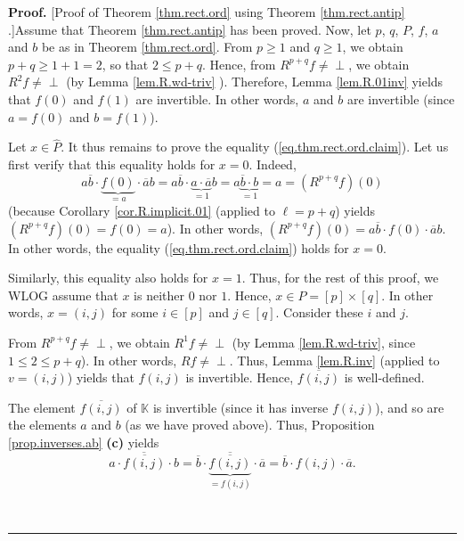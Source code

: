 \documentclass[numbers=enddot,12pt,final,onecolumn,notitlepage]{scrartcl}%
\theoremstyle{definition}
\newenvironment{verlong}{}{}
\newcommand{\undf}{\operatorname*{\bot}}
\newenvironment{proof}[1][Proof]{\noindent\textbf{#1.} }{\ \rule{0.5em}{0.5em}}
\begin{document}
\begin{verlong}
\begin{proof}
[Proof of Theorem \ref{thm.rect.ord} using Theorem \ref{thm.rect.antip}%
.]Assume that Theorem \ref{thm.rect.antip} has been proved. Now, let $p$, $q$,
$P$, $f$, $a$ and $b$ be as in Theorem \ref{thm.rect.ord}. From $p\geq1$ and
$q\geq1$, we obtain $p+q\geq1+1=2$, so that $2\leq p+q$. Hence, from
$R^{p+q}f\neq\undf$, we obtain $R^{2}f\neq\undf$ (by Lemma \ref{lem.R.wd-triv}%
). Therefore, Lemma \ref{lem.R.01inv} yields that $f\left(  0\right)  $ and
$f\left(  1\right)  $ are invertible. In other words, $a$ and $b$ are
invertible (since $a=f\left(  0\right)  $ and $b=f\left(  1\right)  $).

Let $x \in\widehat{P}$. It thus remains to prove the equality
(\ref{eq.thm.rect.ord.claim}). Let us first verify that this equality holds
for $x=0$. Indeed,%
\[
a\overline{b}\cdot\underbrace{f\left(  0\right)  }_{=a}\cdot\overline
{a}b=a\overline{b}\cdot\underbrace{a\cdot\overline{a}}_{=1}%
b=a\underbrace{\overline{b}\cdot b}_{=1}=a=\left(  R^{p+q}f\right)  \left(
0\right)
\]
(because Corollary \ref{cor.R.implicit.01} (applied to $\ell=p+q$) yields
$\left(  R^{p+q}f\right)  \left(  0\right)  =f\left(  0\right)  =a$). In other
words, $\left(  R^{p+q}f\right)  \left(  0\right)  =a\overline{b}\cdot
f\left(  0\right)  \cdot\overline{a}b$. In other words, the equality
(\ref{eq.thm.rect.ord.claim}) holds for $x=0$.

Similarly, this equality also holds for $x=1$. Thus, for the rest of this
proof, we WLOG assume that $x$ is neither $0$ nor $1$. Hence, $x\in P=\left[
p\right]  \times\left[  q\right]  $. In other words, $x=\left(  i,j\right)  $
for some $i\in\left[  p\right]  $ and $j\in\left[  q\right]  $. Consider these
$i$ and $j$.

From $R^{p+q}f\neq\undf$, we obtain $R^{1}f\neq\undf$ (by Lemma
\ref{lem.R.wd-triv}, since $1\leq2\leq p+q$). In other words, $Rf\neq\undf$.
Thus, Lemma \ref{lem.R.inv} (applied to $v=\left(  i,j\right)  $) yields that
$f\left(  i,j\right)  $ is invertible. Hence, $\overline{f\left(  i,j\right)
}$ is well-defined.

The element $\overline{f\left(  i,j\right)  }$ of $\mathbb{K}$ is invertible
(since it has inverse $f\left(  i,j\right)  $), and so are the elements $a$
and $b$ (as we have proved above). Thus, Proposition \ref{prop.inverses.ab}
\textbf{(c)} yields%
\begin{equation}
\overline{a\cdot\overline{f\left(  i,j\right)  }\cdot b}=\overline{b}%
\cdot\underbrace{\overline{\overline{f\left(  i,j\right)  }}}_{=f\left(
i,j\right)  }\cdot\overline{a}=\overline{b}\cdot f\left(  i,j\right)
\cdot\overline{a}. \label{pf.thm.rect.ord.inv-prod}%
\end{equation}



\end{proof}
\end{verlong}
\end{document}
